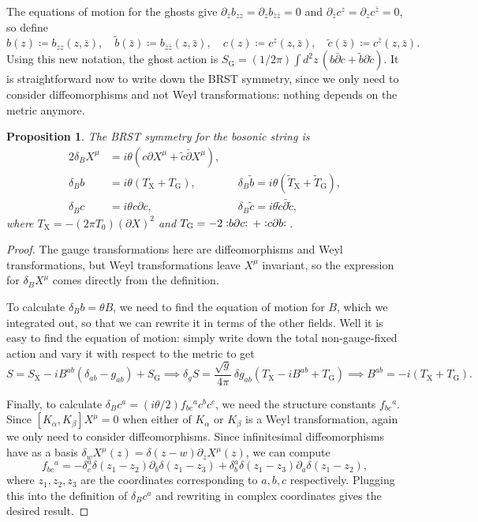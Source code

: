 \documentclass{report}
\theoremstyle{plain}
\newtheorem{proposition}[theorem]{Proposition}
\theoremstyle{definition}
\theoremstyle{remark}
\newcommand{\di}{\partial}
\newcommand{\NO}[1]{\vcentcolon\mathrel{#1}\vcentcolon\,}
\newcommand{\bz}{\bar{z}}
\newcommand{\bdi}{\bar{\di}}
\begin{document}
The equations of motion for the ghosts give $\di_{\bz} b_{zz} = \di_z
b_{\bz\bz} = 0$ and $\di_{\bz} c^z = \di_z c^{\bz} = 0$, so define
\[ b(z) \coloneqq b_{zz}(z, \bz), \quad \tilde{b}(\bz) \coloneqq b_{\bz\bz}(z, \bz), \quad c(z) \coloneqq c^z(z, \bz), \quad \tilde{c}(\bz) \coloneqq c^{\bz}(z, \bz). \]
Using this new notation, the ghost action is $S_{\text{G}} =
(1/2\pi)\int d^2z \, (b\bdi c + \tilde{b} \di \tilde{c})$. It is
straightforward now to write down the BRST symmetry, since we only
need to consider diffeomorphisms and not Weyl transformations: nothing
depends on the metric anymore.

\begin{proposition}
  The BRST symmetry for the bosonic string is
  \begin{alignat*}{2}
    \delta_B X^\mu &= i\theta (c\di X^\mu + \tilde{c}\bdi X^\mu), \\
    \delta_B b &= i\theta (T_{\text{X}} + T_{\text{G}}), &&\delta_B \tilde{b} = i\theta (\tilde{T}_{\text{X}} + \tilde{T}_{\text{G}}), \\
    \delta_B c &= i\theta c \di c, &&\delta_B \tilde{c} = i\theta \tilde{c} \bdi \tilde{c},
  \end{alignat*}
  where $T_{\text{X}} = -(2\pi T_0)(\di X)^2$ and $T_{\text{G}} = -2 \NO{b \di c} + \NO{c \di b}$.
\end{proposition}

\begin{proof}
  The gauge transformations here are diffeomorphisms and Weyl
  transformations, but Weyl transformations leave $X^\mu$ invariant,
  so the expression for $\delta_B X^\mu$ comes directly from the
  definition.

  To calculate $\delta_B b = \theta B$, we need to find the equation
  of motion for $B$, which we integrated out, so that we can rewrite
  it in terms of the other fields. Well it is easy to find the
  equation of motion: simply write down the total non-gauge-fixed
  action and vary it with respect to the metric to get
  \[ S = S_{\text{X}} - iB^{ab}(\delta_{ab} - g_{ab}) + S_{\text{G}} \implies \delta_g S = \frac{\sqrt{g}}{4\pi} \, \delta g_{ab}(T_{\text{X}} - iB^{ab} + T_{\text{G}}) \implies B^{ab} = -i(T_{\text{X}} + T_{\text{G}}). \]

  Finally, to calculate $\delta_B c^a = (i\theta/2) f_{bc}{}^a c^b
  c^c$, we need the structure constants $f_{bc}{}^a$. Since
  $[K_\alpha, K_\beta] X^\mu = 0$ when either of $K_\alpha$ or
  $K_\beta$ is a Weyl transformation, again we only need to consider
  diffeomorphisms. Since infinitesimal diffeomorphisms have as a basis
  $\delta_w X^\mu(z) = \delta(z - w) \di_z X^\mu(z)$, we can compute
  \[ f_{bc}{}^a = -\delta_c^a \delta(z_1 - z_2) \di_b \delta(z_1 - z_3) + \delta_b^a \delta(z_1 - z_3) \di_a \delta(z_1 - z_2), \]
  where $z_1, z_2, z_3$ are the coordinates corresponding to $a, b, c$
  respectively. Plugging this into the definition of $\delta_B c^a$
  and rewriting in complex coordinates gives the desired result.
\end{proof}
\end{document}
